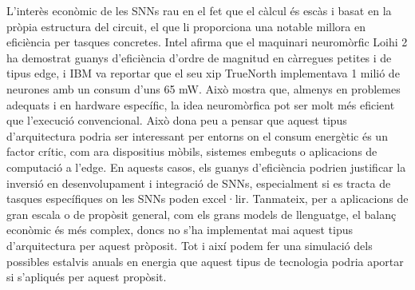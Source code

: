 \documentclass[a4paper,11pt, titlepage, twoside]{article}
\begin{document}
L'interès econòmic de les SNNs rau en el fet que el càlcul és escàs i basat en la pròpia estructura del circuit, el que li proporciona una notable millora en eficiència per tasques concretes. Intel afirma que el maquinari neuromòrfic Loihi 2 ha demostrat guanys d'eficiència d'ordre de magnitud en càrregues petites i de tipus edge, i IBM va reportar que el seu xip TrueNorth implementava 1 milió de neurones amb un consum d'uns 65 mW. Això mostra que, almenys en problemes adequats i en hardware específic, la idea neuromòrfica pot ser molt més eficient que l'execució convencional. Això dona peu a pensar que aquest tipus d'arquitectura podria ser interessant per entorns on el consum energètic és un factor crític, com ara dispositius mòbils, sistemes embeguts o aplicacions de computació a l'edge. En aquests casos, els guanys d'eficiència podrien justificar la inversió en desenvolupament i integració de SNNs, especialment si es tracta de tasques específiques on les SNNs poden excel·lir. Tanmateix, per a aplicacions de gran escala o de propòsit general, com els grans models de llenguatge, el balanç econòmic és més complex, doncs no s'ha implementat mai aquest tipus d'arquitectura per aquest pròposit. Tot i així podem fer una simulació dels possibles estalvis anuals en energia que aquest tipus de tecnologia podria aportar si s'apliqués per aquest propòsit.
\end{document}
